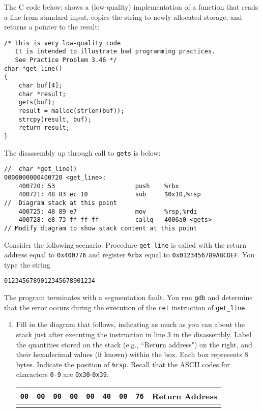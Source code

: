 \documentclass[12pt]{article}
\newenvironment{ex}[2][Exercise]{\begin{trivlist}
		\item[\hskip \labelsep {\bfseries #1}\hskip \labelsep {\bfseries #2.}]}{\end{trivlist}}
\begin{document}
{\begin{ex}{3.46}
	The C code below: shows a (low-quality) implementation of a function that reads a line from standard input,
	copies the string to newly allocated storage, and returns a pointer to the result:
	\begin{lstlisting}
/* This is very low-quality code
   It is intended to illustrate bad programming practices.
   See Practice Problem 3.46 */
char *get_line()
{
	char buf[4];
	char *result;
	gets(buf);
	result = malloc(strlen(buf));
	strcpy(result, buf);
	return result;
}
	\end{lstlisting}
	The disassembly up through call to \texttt{gets} is below:
	\begin{lstlisting}[language={}]
//	char *get_line()
0000000000400720 <get_line>:
	400720:	53						push	%rbx
	400721:	48 83 ec 10				sub		$0x10,%rsp
//	Diagram stack at this point
	400725:	48 89 e7				mov		%rsp,%rdi
	400728: e8 73 ff ff ff			callq	4006a0 <gets>
// Modify diagram to show stack content at this point
	\end{lstlisting}
	Consider the following scenario. Procedure \texttt{get\_line} is called with the return address
	equal to \texttt{0x400776} and register \texttt{\%rbx} equal to \texttt{0x0123456789ABCDEF}.
	You type the string
	\begin{center}
		\texttt{0123456789012345678901234}
	\end{center}
	The program terminates with a segmentation fault. You run \texttt{gdb} and determine that the
	error occurs during the execution of the \texttt{ret} instruction of \texttt{get\_line}.
	\begin{enumerate}[label=(\alph*)]
		\item Fill in the diagram that follows, indicating as much as you can about the stack
		just after executing the instruction in line 3 in the disassembly. Label the quantities
		stored on the stack (e.g., ``Return address") on the right, and their hexadecimal values
		(if known) within the box. Each box represents 8 bytes. Indicate the position of \texttt{\%rsp}.
		Recall that the ASCII codes for characters \texttt{0-9} are \texttt{0x30}-\texttt{0x39}.
		\begin{center}
			\begin{tabular}{|cccccccc|c|}
				\hline
				\texttt{00} & \texttt{00} & \texttt{00} & \texttt{00} & \texttt{00} & \texttt{40}&
				\texttt{00} & \texttt{76} & Return Address\\
				\hline
				\texttt{} & \texttt{} & \texttt{} & \texttt{} & \texttt{} & \texttt{}&

\end{tabular}
\end{center}
\end{enumerate}
\end{ex}}
\end{document}
